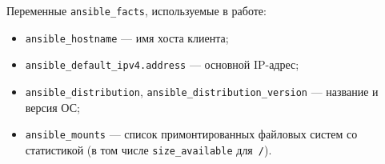 Переменные \texttt{ansible\_facts}, используемые в работе:
\begin{itemize}
  \item \texttt{ansible\_hostname} — имя хоста клиента;
  \item \texttt{ansible\_default\_ipv4.address} — основной IP-адрес;
  \item \texttt{ansible\_distribution}, \texttt{ansible\_distribution\_version}
        — название и версия ОС;
  \item \texttt{ansible\_mounts} — список примонтированных файловых систем
        со статистикой (в том числе \texttt{size\_available} для~\texttt{/}).
\end{itemize}

\endinput

